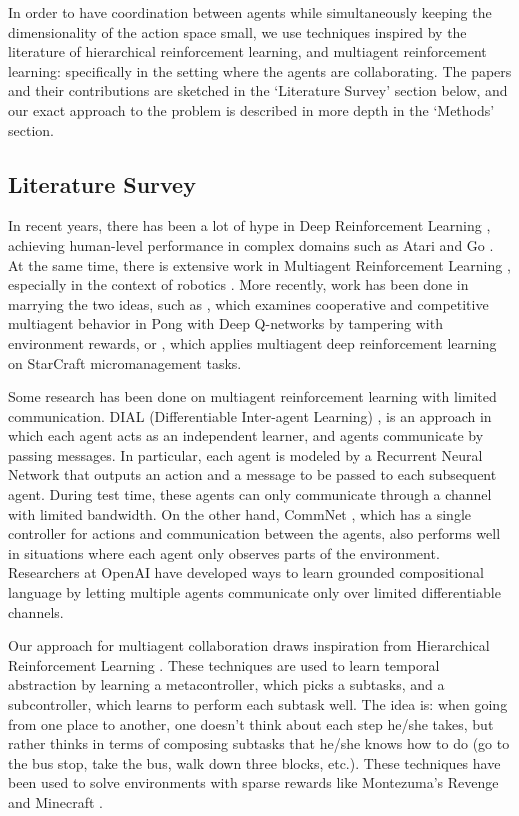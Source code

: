 \documentclass{article}
\begin{document}
In order to have coordination between agents while
simultaneously keeping the dimensionality
of the action space small, we use techniques inspired
by the literature of hierarchical reinforcement learning,
and multiagent reinforcement learning: specifically in
the setting where the agents are collaborating.
The papers and their contributions are sketched in
the `Literature Survey' section below, and our exact
approach to the problem is described in more depth
in the `Methods' section.

\subsection*{Literature Survey}

In recent years, there has been a lot of hype in Deep
Reinforcement Learning \cite{mnih2015human}, achieving
human-level performance in complex domains such as Atari
\cite{mnih2013playing} and Go \cite{silver2016mastering}. At
the same time, there is extensive work in Multiagent
Reinforcement Learning \cite{busoniu2008comprehensive},
especially in the context of robotics \cite{spaan2002high,
 fox2000probabilistic, mataric1997reinforcement}. More recently,
work has been done in marrying the two ideas, such as
\cite{tampuu2017multiagent}, which examines cooperative
and competitive multiagent behavior in Pong with Deep Q-networks by
tampering with environment rewards, or
\cite{usunier2016episodic, peng2017multiagent}, which applies multiagent deep
reinforcement learning on StarCraft micromanagement tasks.


Some research has been done on multiagent reinforcement learning
with limited communication. DIAL (Differentiable Inter-agent Learning) \cite{foerster2016learning},
is an approach in which
each agent acts as an independent learner, and agents communicate
by passing messages. In particular, each agent is modeled by
a Recurrent Neural Network that outputs an action and a message
to be passed to each subsequent agent. During test time, these
agents can only communicate through a channel with limited bandwidth.
On the other hand, CommNet \cite{sukhbaatar2016learning}, which
has a single controller for actions and communication
between the agents, also performs well in situations where each agent only
observes parts of the environment. Researchers at OpenAI
have developed ways to learn grounded compositional language
\cite{mordatch2017emergence} by letting multiple agents
communicate only over limited differentiable channels.


Our approach for multiagent collaboration draws inspiration from
Hierarchical Reinforcement Learning \cite{kulkarni2016hierarchical}. These techniques are used to learn
temporal abstraction by learning a metacontroller, which picks
a subtasks, and a subcontroller, which learns to perform each
subtask well. The idea is: when going from one place to another,
one doesn't think about each step he/she takes, but rather
thinks in terms of composing subtasks that he/she knows how to do (go to
the bus stop, take the bus, walk down three blocks, etc.).
These techniques have been used to solve environments with
sparse rewards like Montezuma's Revenge and Minecraft
\cite{tessler2016deep}.
\end{document}
